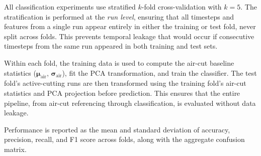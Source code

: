 All classification experiments use stratified $k$-fold cross-validation with $k = 5$. The stratification is performed at the \emph{run level}, ensuring that all timesteps and features from a single run appear entirely in either the training or test fold, never split across folds. This prevents temporal leakage that would occur if consecutive timesteps from the same run appeared in both training and test sets.

Within each fold, the training data is used to compute the air-cut baseline statistics ($\boldsymbol{\mu}_\text{air}$, $\boldsymbol{\sigma}_\text{air}$), fit the PCA transformation, and train the classifier. The test fold's active-cutting runs are then transformed using the training fold's air-cut statistics and PCA projection before prediction. This ensures that the entire pipeline, from air-cut referencing through classification, is evaluated without data leakage.

Performance is reported as the mean and standard deviation of accuracy, precision, recall, and F1 score across folds, along with the aggregate confusion matrix.
